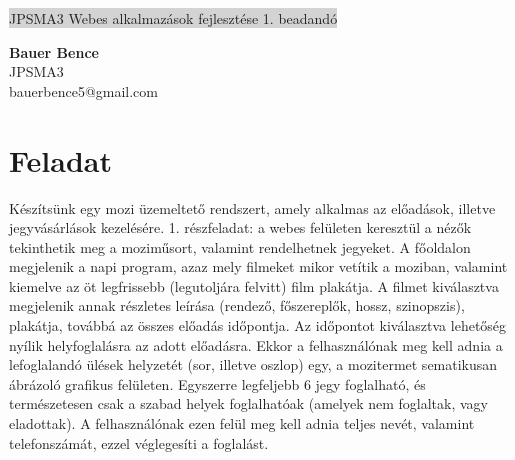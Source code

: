 \documentclass[11pt,a4paper]{article}
\begin{document}
\renewcommand{\labelitemi}{\textbullet}
\def\br{\\[0.1cm]}
\thispagestyle{empty}
\begin{center}
	\colorbox{lightgray}{{\large JPSMA3} \hspace{3cm} {\large Webes alkalmazások fejlesztése 1. beadandó} \hspace{5cm} \thepage}
\end{center}
\begin{framed}
	\begin{flushleft}
		{\large \textbf{Bauer Bence}}
		\hspace{5.4cm}{\large 2019.03.13.}\br
		{\large JPSMA3}\br
		{\large bauerbence5@gmail.com}
	\end{flushleft}
\end{framed}
\section{Feladat}
Készítsünk egy mozi üzemeltető rendszert, amely alkalmas az előadások, illetve
jegyvásárlások kezelésére.
1. részfeladat: a webes felületen keresztül a nézők tekinthetik meg a moziműsort,
valamint rendelhetnek jegyeket.
A főoldalon megjelenik a napi program, azaz mely filmeket mikor vetítik a
moziban, valamint kiemelve az öt legfrissebb (legutoljára felvitt) film plakátja.
A filmet kiválasztva megjelenik annak részletes leírása (rendező, főszereplők,
hossz, szinopszis), plakátja, továbbá az összes előadás időpontja.
Az időpontot kiválasztva lehetőség nyílik helyfoglalásra az adott előadásra.
Ekkor a felhasználónak meg kell adnia a lefoglalandó ülések helyzetét (sor,
illetve oszlop) egy, a mozitermet sematikusan ábrázoló grafikus felületen.
Egyszerre legfeljebb 6 jegy foglalható, és természetesen csak a szabad helyek
foglalhatóak (amelyek nem foglaltak, vagy eladottak). A felhasználónak ezen
felül meg kell adnia teljes nevét, valamint telefonszámát, ezzel véglegesíti a
foglalást.
\end{document}

